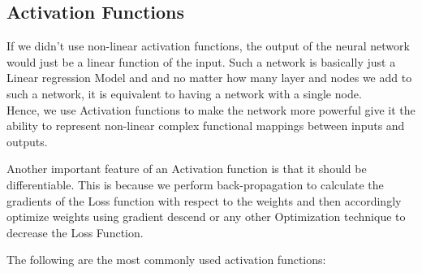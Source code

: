 \documentclass[twoside]{article}
\begin{document}
\subsection{Activation Functions}

If we didn't use non-linear activation functions, the output of the neural network would just be a linear function of the input. Such a network is basically just a Linear regression Model and and no matter how many layer and nodes we add to such a network, it is equivalent to having a network with a single node.\\

Hence, we use Activation functions to make the network more powerful give it the ability to represent non-linear complex functional mappings between inputs and outputs.

Another important feature of an Activation function is that it should be differentiable. This is because we perform back-propagation to calculate the gradients of the Loss function with respect to the weights and then accordingly optimize weights using gradient descend or any other Optimization technique to decrease the Loss Function.

The following are the most commonly used activation functions:
\end{document}
